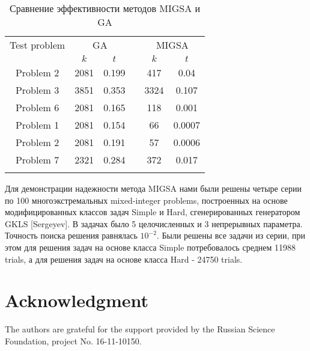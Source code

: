\documentclass{llncs}
\begin{document}
\begin{table}
	\caption{Сравнение эффективности методов MIGSA и GA}
	\label{tab:1}
	\center
	\begin{tabular}{cccccc}
		\hline\noalign{\smallskip}
		Test problem & \multicolumn{2}{c}{ GA } & & \multicolumn{2}{c}{MIGSA} \\
		\noalign{\smallskip} \cline{2-3} \cline{5-6} \noalign{\smallskip}
		 & $k$ & $t$ & & $k$ & $t$  \\
		\noalign{\smallskip} \hline \noalign{\smallskip}
		 Problem 2 \cite{Floudas}&	2081 &	0.199 & &	417 &	0.04 \\
		 Problem 3 \cite{Floudas}& 	3851 &	0.353 & & 3324 &	0.107 \\
		 Problem 6 \cite{Floudas}&	2081 &	0.165 & &	118 &	0.001 \\
		 Problem 1 \cite{Deep}   &	2081 &	0.154 & &	66 &	0.0007 \\
		 Problem 2 \cite{Deep}   &	2081 &	0.191 & &	57 &	0.0006 \\
		 Problem 7 \cite{Deep}   &	2321 &	0.284 & & 372	 &	0.017 \\
		\noalign{\smallskip}\hline
	\end{tabular}
\end{table}

Для демонстрации надежности метода MIGSA нами были решены четыре серии по 100 многоэкстремальных mixed-integer problems, построенных на основе модифицированных классов задач Simple и Hard, сгенерированных генератором GKLS [Sergeyev]. В задачах было 5 целочисленных и 3 непрерывных параметра. Точность поиска решения равнялась $10^{-2}$. Были решены все задачи из серии, при этом для решения задач на основе класса Simple потребовалось среднем 11988 trials, а для решения задач на основе класса Hard - 24750 trials.

\section*{Acknowledgment}
The authors are grateful for the support provided by the Russian Science Foundation, project No. 16-11-10150.
\end{document}
